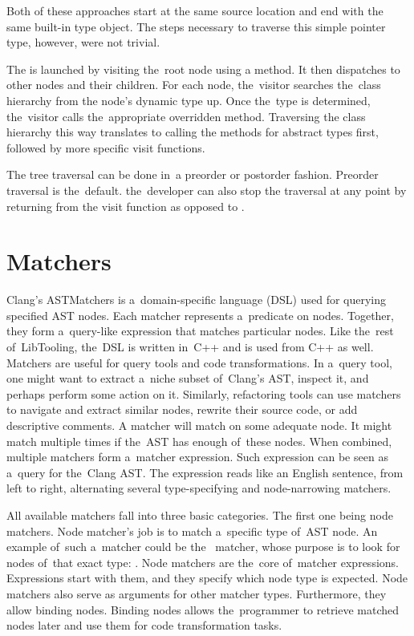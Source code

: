 Both of these approaches start at the same source location and end 
with the same built-in type object. 
The steps necessary to traverse this simple pointer type, however, 
were not trivial.

The  is launched by visiting the~root node using 
a  method. 
It then dispatches to other nodes and their children. 
For each node, the~visitor searches the~class hierarchy from 
the node's dynamic type up. 
Once the~type is determined, the~visitor calls the~appropriate 
overridden  method. 
Traversing the class hierarchy this way translates to calling the methods 
for abstract types first, followed by more specific visit functions.

The tree traversal can be done in~a preorder or postorder fashion. 
Preorder traversal is the~default. the~developer can also stop
the traversal at any point by returning  from
the visit function as opposed to .

\section{Matchers}

Clang's ASTMatchers \citep{matchers:online} 
is a~domain-specific language (DSL) used for querying 
specified AST nodes. 
Each matcher represents a~predicate on nodes. 
Together, they form a~query-like expression that matches particular nodes. 
Like the~rest of~LibTooling, the~DSL is written in~C++ and is used from 
C++ as well.
Matchers are useful for query tools and code transformations. 
In a~query tool, one might want to extract a~niche subset of~Clang's AST, 
inspect it, and perhaps perform some action on it. 
Similarly, refactoring tools can use matchers to navigate and extract 
similar nodes, rewrite their source code, or add descriptive comments.
A matcher will match on some adequate node. 
It might match multiple times if the~AST has enough of~these nodes. 
When combined, multiple matchers form a~matcher expression. 
Such expression can be seen as a~query for the~Clang AST. 
The expression reads like an English sentence, from left to right, 
alternating several type-specifying and node-narrowing matchers.

All available matchers fall into three basic categories. 
The first one being node matchers. 
Node matcher's job is to match a~specific type of~AST node. 
An example of~such a~matcher could be the~ 
matcher, whose purpose is to look for nodes of~that exact 
type: . 
Node matchers are the~core of~matcher expressions. 
Expressions start with them, and they specify which node type is expected. 
Node matchers also serve as arguments for other matcher types. 
Furthermore, they allow binding nodes. 
Binding nodes allows the~programmer to retrieve matched nodes later and 
use them for code transformation tasks. 

